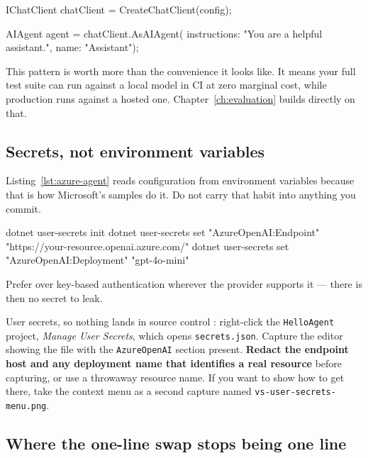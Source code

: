 \begin{csharp}[caption={Agent construction, now provider-blind}, label={lst:provider-blind}]
IChatClient chatClient = CreateChatClient(config);

AIAgent agent = chatClient.AsAIAgent(
    instructions: "You are a helpful assistant.",
    name: "Assistant");
\end{csharp}

\begin{note}
This pattern is worth more than the convenience it looks like. It means your full
test suite can run against a local model in CI at zero marginal cost, while
production runs against a hosted one. Chapter~\ref{ch:evaluation} builds directly
on that.
\end{note}

\subsection{Secrets, not environment variables}

Listing~\ref{lst:azure-agent} reads configuration from environment variables
because that is how Microsoft's samples do it. Do not carry that habit into
anything you commit.

\begin{shellcmd}
dotnet user-secrets init
dotnet user-secrets set "AzureOpenAI:Endpoint" "https://your-resource.openai.azure.com/"
dotnet user-secrets set "AzureOpenAI:Deployment" "gpt-4o-mini"
\end{shellcmd}

Prefer  over key-based authentication wherever the
provider supports it --- there is then no secret to leak.

%
{User secrets, so nothing lands in source control}%
{\vsver{}: right-click the \texttt{HelloAgent} project, \emph{Manage User
Secrets}, which opens \texttt{secrets.json}. Capture the editor showing the file
with the \texttt{AzureOpenAI} section present. \textbf{Redact the endpoint host
and any deployment name that identifies a real resource} before capturing, or use
a throwaway resource name. If you want to show how to get there, take the context
menu as a second capture named \texttt{vs-user-secrets-menu.png}.}

\subsection{Where the one-line swap stops being one line}
\label{sec:swap-limits}


